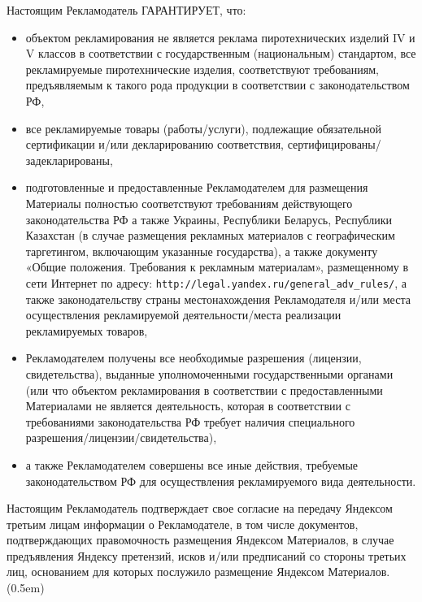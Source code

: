 \noindent
    Настоящим Рекламодатель ГАРАНТИРУЕТ, что:
\begin{itemize}
    \item объектом рекламирования не является реклама пиротехнических изделий IV и V классов в соответствии с государственным (национальным) стандартом, все рекламируемые пиротехнические изделия, соответствуют требованиям, предъявляемым к такого рода продукции в соответствии с законодательством РФ,
    \item все рекламируемые товары (работы/услуги), подлежащие обязательной сертификации и/или декларированию соответствия, сертифицированы/задекларированы,
    \item подготовленные и предоставленные Рекламодателем для размещения Материалы полностью соответствуют требованиям действующего законодательства РФ а также Украины, Республики Беларусь, Республики Казахстан (в случае размещения рекламных материалов с географическим таргетингом, включающим указанные государства), а также документу «Общие положения. Требования к рекламным материалам», размещенному в сети Интернет по адресу: \lb \verb|http://legal.yandex.ru/general_adv_rules/|, а также законодательству страны местонахождения Рекламодателя и/или места осуществления рекламируемой деятельности/места реализации рекламируемых товаров,
    \item Рекламодателем получены все необходимые разрешения (лицензии, свидетельства), выданные уполномоченными государственными органами (или что объектом рекламирования в соответствии с предоставленными Материалами не является деятельность, которая в соответствии с требованиями законодательства РФ требует наличия специального разрешения/лицензии/свидетельства),
    \item а также Рекламодателем совершены все иные действия, требуемые законодательством РФ для осуществления рекламируемого вида деятельности.
\end{itemize}

\noindent
    Настоящим Рекламодатель подтверждает свое согласие на передачу Яндексом третьим лицам информации о Рекламодателе, в том числе документов, подтверждающих правомочность размещения Яндексом Материалов, в случае предъявления Яндексу претензий, исков и/или предписаний со стороны третьих лиц, основанием для которых послужило размещение Яндексом Материалов.
\vspace(0.5em)

